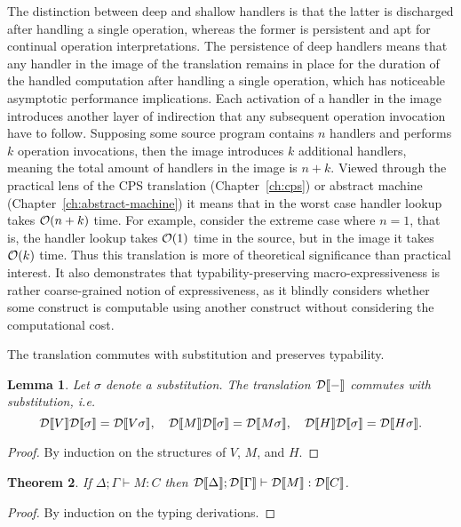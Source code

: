 \documentclass[12pt,phd,lfcs,twoside,openright,logo,leftchapter,normalheadings]{infthesis}
\theoremstyle{plain}
\newtheorem{theorem}{Theorem}[chapter]
\newtheorem{lemma}[theorem]{Lemma}
\theoremstyle{definition}
\begin{document}
The distinction between deep and shallow handlers is that the latter
is discharged after handling a single operation, whereas the former is
persistent and apt for continual operation interpretations. The
persistence of deep handlers means that any handler in the image of
the translation remains in place for the duration of the handled
computation after handling a single operation, which has noticeable
asymptotic performance implications. Each activation of a handler in
the image introduces another layer of indirection that any subsequent
operation invocation have to follow. Supposing some source program
contains $n$ handlers and performs $k$ operation invocations, then the
image introduces $k$ additional handlers, meaning the total amount of
handlers in the image is $n+k$. Viewed through the practical lens of
the CPS translation (Chapter~\ref{ch:cps}) or abstract machine
(Chapter~\ref{ch:abstract-machine}) it means that in the worst case
handler lookup takes $\mathcal{O}(n+k)$ time. For example, consider the
extreme case where $n = 1$, that is, the handler lookup takes
$\mathcal{O}(1)$ time in the source, but in the image it takes $\mathcal{O}(k)$
time.
%
Thus this translation is more of theoretical significance than
practical interest. It also demonstrates that typability-preserving
macro-expressiveness is rather coarse-grained notion of
expressiveness, as it blindly considers whether some construct is
computable using another construct without considering the
computational cost.

The translation commutes with substitution and preserves typability.
%
\begin{lemma}\label{lem:sdtrans-subst}
  Let $\sigma$ denote a substitution. The translation $\mathcal{D}\llbracket - \rrbracket$
  commutes with substitution, i.e.
  \[
    \mathcal{D}\llbracket V \rrbracket\mathcal{D}\llbracket \sigma \rrbracket = \mathcal{D}\llbracket V\sigma \rrbracket,\quad
    \mathcal{D}\llbracket M \rrbracket\mathcal{D}\llbracket \sigma \rrbracket = \mathcal{D}\llbracket M\sigma \rrbracket,\quad
    \mathcal{D}\llbracket H \rrbracket\mathcal{D}\llbracket \sigma \rrbracket = \mathcal{D}\llbracket H\sigma \rrbracket.
  \]
\end{lemma}
%
\begin{proof}
  By induction on the structures of $V$, $M$, and $H$.
\end{proof}
%
\begin{theorem}
If $\Delta; \Gamma \vdash M : C$ then $\mathcal{D}\llbracket \Delta \rrbracket;
\mathcal{D}\llbracket \Gamma \rrbracket \vdash \mathcal{D}\llbracket M \rrbracket : \mathcal{D}\llbracket C \rrbracket$.
\end{theorem}
%
\begin{proof}
  By induction on the typing derivations.
\end{proof}

\newcommand{\admin}{admin}
\newcommand{\approxa}{\gtrsim}
\end{document}
